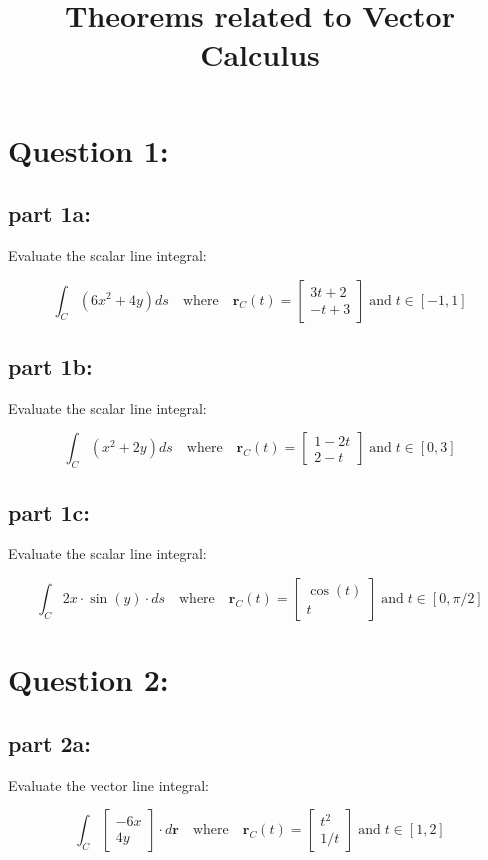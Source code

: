 \documentclass{article}
\title{Theorems related to Vector Calculus}
\date{}
\newcommand{\colxyvec}[2]{\begin{bmatrix} #1 \\ #2 \end{bmatrix}}
\begin{document}
\maketitle


\section*{Question 1:}

\subsection*{part 1a:}

Evaluate the scalar line integral: 

\[\int_C (6x^2 + 4y)ds \quad\text{where}\quad \mathbf{r}_C(t) = \colxyvec{3t + 2}{-t + 3} \;\text{and}\; t \in [-1,1]\]


\subsection*{part 1b:}

Evaluate the scalar line integral: 

\[\int_C (x^2 + 2y)ds \quad\text{where}\quad \mathbf{r}_C(t) = \colxyvec{1 - 2t}{2 - t} \;\text{and}\; t \in [0,3]\]


\subsection*{part 1c:}

Evaluate the scalar line integral: 

\[\int_C 2x \cdot \sin(y) \cdot ds \quad\text{where}\quad \mathbf{r}_C(t) = \colxyvec{\cos(t)}{t} \;\text{and}\; t \in [0,\pi/2]\]




\section*{Question 2:}

\subsection*{part 2a:}

Evaluate the vector line integral: 

\[\int_C \colxyvec{-6x}{4y} \cdot d\mathbf{r} \quad\text{where}\quad \mathbf{r}_C(t) = \colxyvec{t^2}{1/t} \;\text{and}\; t \in [1,2]\]
\end{document}
